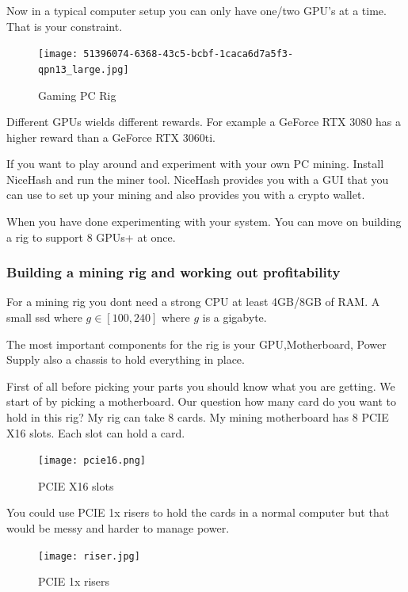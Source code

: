 Now in a typical computer setup you can only have one/two GPU's at a time. That is your constraint.

\begin{figure}[H]
\centering
\texttt{[image: 51396074-6368-43c5-bcbf-1caca6d7a5f3-qpn13\_large.jpg]}
\caption{Gaming PC Rig}
\label{fig:pc}
\end{figure}


Different GPUs wields different rewards. For example a GeForce RTX 3080 has a higher reward than a GeForce RTX 3060ti.

If you want to play around and experiment with your own PC mining. Install NiceHash and run the miner tool. NiceHash provides you with a GUI that you can use to set up your mining and also provides you with a crypto wallet.

When you have done experimenting with your system. You can move on building a rig to support 8 GPUs+ at once.

\subsubsection{Building a mining rig and working out profitability} 

For a mining rig you dont need a strong CPU at least 4GB/8GB of RAM. A small ssd where $g \in [100,240]$ where $g$ is a gigabyte.

The most important components for the rig is your GPU,Motherboard, Power Supply also a chassis to hold everything in place.

First of all before picking your parts you should know what you are getting.
We start of by picking a motherboard. Our question how many card do you want to hold in this rig?
My rig can take 8 cards. My mining motherboard has 8 PCIE X16 slots. Each slot can hold a card.

\begin{figure}[H]
\centering
\texttt{[image: pcie16.png]}
\caption{PCIE X16 slots}
\label{fig:pcie16}
\end{figure}

You could use PCIE 1x risers to hold the cards in a normal computer but that would be messy and harder to manage power.

\begin{figure}[H]
\centering
\texttt{[image: riser.jpg]}
\caption{PCIE 1x risers}
\label{fig:pcie1x}
\end{figure}




